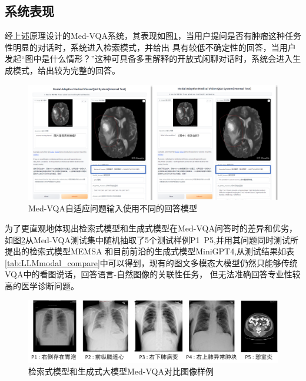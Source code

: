 \subsection{系统表现}
经上述原理设计的Med-VQA系统，其表现如图\ref{sys_adaptive}，当用户提问是否有肿瘤这种任务性明显的对话时，系统进入检索模式，并给出
具有较低不确定性的回答，当用户发起“图中是什么情形？”这种可具备多重解释的开放式闲聊对话时，系统会进入生成模式，给出较为完整的回答。
\begin{figure}[htbp]
	\centering	
	\includegraphics[width=1\textwidth]{Fig/myfig/chapter5/sys_adaptive.png}  %
	\caption{\label{sys_adaptive}Med-VQA自适应问题输入使用不同的回答模型} 
\end{figure}

为了更直观地体现出检索式模型和生成式模型在Med-VQA问答时的差异和优劣，如图\ref{fig_compare}从Med-VQA测试集中随机抽取了5个测试样例P1~P5,并用其问题同时测试所提出的检索式模型MEMSA
和目前前沿的生成式模型MiniGPT4\cite{zhu2023minigpt},从测试结果如表\ref{tab:LLMmodal_compare}中可以得到，现有的图文多模态大模型仍然只能够传统VQA中的看图说话，回答语言-自然图像的关联性任务，
但无法准确回答专业性较高的医学诊断问题。
\begin{figure}[htbp]
	\centering	
	\includegraphics[width=1\textwidth]{Fig/myfig/chapter5/fig_compare.png}  %
	\caption{\label{fig_compare}检索式模型和生成式大模型Med-VQA对比图像样例} 
\end{figure}

